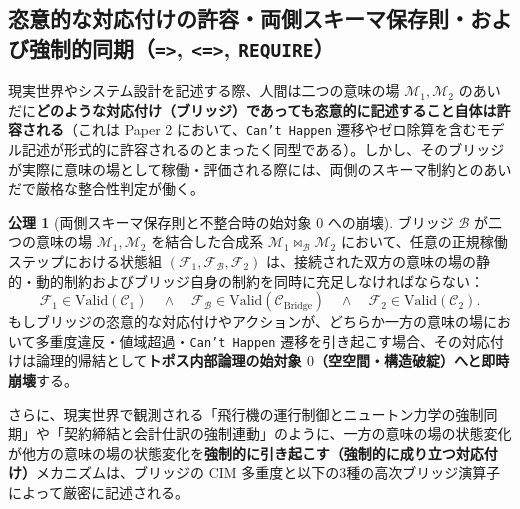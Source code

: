 \documentclass[11pt,a4paper]{ltjsarticle}
\theoremstyle{definition}
\newtheorem{axiom}{公理}[section]
\theoremstyle{plain}
\theoremstyle{remark}
\newcommand{\Valid}{\mathrm{Valid}}
\newcommand{\CBridge}{\mathcal{C}_{\mathrm{Bridge}}}
\begin{document}
\subsection{恣意的な対応付けの許容・両側スキーマ保存則・および強制的同期（\texttt{=>}, \texttt{<=>}, \texttt{REQUIRE}）}
現実世界やシステム設計を記述する際、人間は二つの意味の場 $\mathcal{M}_1, \mathcal{M}_2$ のあいだに\textbf{どのような対応付け（ブリッジ）であっても恣意的に記述すること自体は許容される}（これは Paper 2 において、\texttt{Can't Happen} 遷移やゼロ除算を含むモデル記述が形式的に許容されるのとまったく同型である）。しかし、そのブリッジが実際に意味の場として稼働・評価される際には、両側のスキーマ制約とのあいだで厳格な整合性判定が働く。

\begin{axiom}[両側スキーマ保存則と不整合時の始対象 $0$ への崩壊]\label{ax:bilateral-conservation}
ブリッジ $\mathcal{B}$ が二つの意味の場 $\mathcal{M}_1, \mathcal{M}_2$ を結合した合成系 $\mathcal{M}_1 \bowtie_{\mathcal{B}} \mathcal{M}_2$ において、任意の正規稼働ステップにおける状態組 $(\mathcal{F}_1, \mathcal{F}_{\mathcal{B}}, \mathcal{F}_2)$ は、接続された双方の意味の場の静的・動的制約およびブリッジ自身の制約を同時に充足しなければならない：
\begin{equation}
\mathcal{F}_1 \in \Valid(\mathcal{C}_1) \quad \wedge \quad \mathcal{F}_{\mathcal{B}} \in \Valid(\CBridge) \quad \wedge \quad \mathcal{F}_2 \in \Valid(\mathcal{C}_2).
\end{equation}
もしブリッジの恣意的な対応付けやアクションが、どちらか一方の意味の場において多重度違反・値域超過・\texttt{Can't Happen} 遷移を引き起こす場合、その対応付けは論理的帰結として\textbf{トポス内部論理の始対象 $0$（空空間・構造破綻）へと即時崩壊}する。
\end{axiom}

さらに、現実世界で観測される「飛行機の運行制御とニュートン力学の強制同期」や「契約締結と会計仕訳の強制連動」のように、一方の意味の場の状態変化が他方の意味の場の状態変化を\textbf{強制的に引き起こす（強制的に成り立つ対応付け）}メカニズムは、ブリッジの CIM 多重度と以下の3種の高次ブリッジ演算子によって厳密に記述される。
\end{document}
